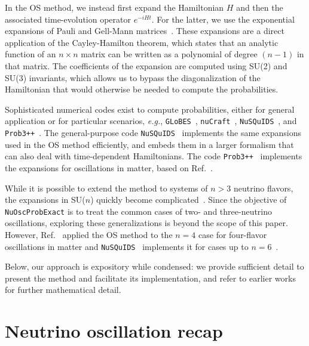 \documentclass[final,5p,times,twocolumn]{elsarticle}
\newcommand{\eg}{{\it e.g.}}
\newcommand{\Ref}{Ref.}
\begin{document}
In the OS method, we instead first expand the Hamiltonian $H$ and then the associated time-evolution operator $e^{-i H t}$.  For the latter, we use the exponential expansions of Pauli and Gell-Mann matrices\ \cite{MacFarlane:1968vc, Curtright:2015iba, VanKortryk:2015kua}.  These expansions are a direct application of the Cayley-Hamilton theorem, which states that an analytic function of an $n \times n$ matrix can be written as a polynomial of degree $(n-1)$ in that matrix.  The coefficients of the expansion are computed using SU(2) and SU(3) invariants, which allows us to bypass the diagonalization of the Hamiltonian that would otherwise be needed to compute the probabilities.  

Sophisticated numerical codes exist to compute probabilities, either for general application or for particular scenarios, \eg, {\tt GLoBES}\ \cite{GLoBES}, {\tt nuCraft}\ \cite{nuCraft}, {\tt NuSQuIDS}\ \cite{NuSQuIDS}, and {\tt Prob3++}\ \cite{Prob3pp}.  The general-purpose code {\tt NuSQuIDS}\ \cite{Delgado:2014kpa, NuSQuIDS} implements the same expansions used in the OS method efficiently, and embeds them in a larger formalism that can also deal with time-dependent Hamiltonians.  The code {\tt Prob3++}\ \cite{Prob3pp} implements the expansions for oscillations in matter, based on \Ref\ \cite{Barger:1980tf}. 

While it is possible to extend the method to systems of $n > 3$ neutrino flavors, the expansions in SU($n$) quickly become complicated\ \cite{Kusnezov:1995, VanKortryk:2015kua}.  Since the objective of {\tt NuOscProbExact} is to treat the common cases of two- and three-neutrino oscillations, exploring these generalizations is beyond the scope of this paper.  However, \Ref\ \cite{Kamo:2002sj} applied the OS method to the $n=4$ case for four-flavor oscillations in matter and {\tt NuSQuIDS}\ \cite{Delgado:2014kpa, NuSQuIDS} implements it for cases up to $n=6$\ \cite{Salvado:Private}.  

Below, our approach is expository while condensed: we provide sufficient detail to present the method and facilitate its implementation, and refer to earlier works for further mathematical detail.




\section{Neutrino oscillation recap}
\label{section:general_remarks}
\end{document}
